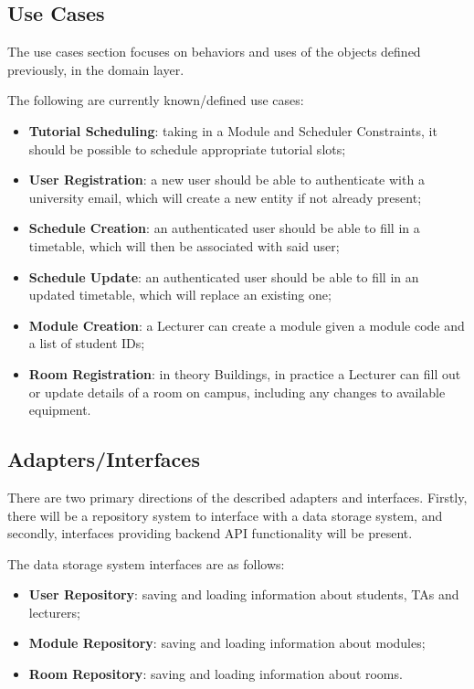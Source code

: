 \documentclass[12pt, a4paper]{article}
\begin{document}
\subsection{Use Cases}

The use cases section focuses on behaviors and uses of the objects defined previously, in the domain layer.

The following are currently known/defined use cases:

\begin{itemize}
\item \textbf{Tutorial Scheduling}: taking in a Module and Scheduler Constraints, it should be possible to schedule appropriate tutorial slots;
\item \textbf{User Registration}: a new user should be able to authenticate with a university email, which will create a new entity if not already present;
\item \textbf{Schedule Creation}: an authenticated user should be able to fill in a timetable, which will then be associated with said user;
\item \textbf{Schedule Update}: an authenticated user should be able to fill in an updated timetable, which will replace an existing one;
\item \textbf{Module Creation}: a Lecturer can create a module given a module code and a list of student IDs;
\item \textbf{Room Registration}: in theory Buildings, in practice a Lecturer can fill out or update details of a room on campus, including any changes to available equipment.
\end{itemize}

\subsection{Adapters/Interfaces}

There are two primary directions of the described adapters and interfaces.
Firstly, there will be a repository system to interface with a data storage system, and secondly, interfaces providing backend API functionality will be present.

The data storage system interfaces are as follows:

\begin{itemize}
\item \textbf{User Repository}: saving and loading information about students, TAs and lecturers;
\item \textbf{Module Repository}: saving and loading information about modules;
\item \textbf{Room Repository}: saving and loading information about rooms.
\end{itemize}
\end{document}
